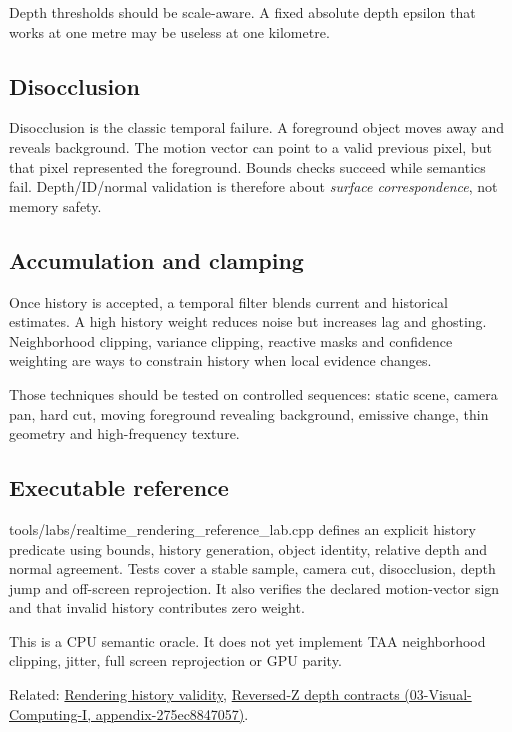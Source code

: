 Depth thresholds should be scale-aware. A fixed absolute depth epsilon that works at one metre may be useless at one kilometre.

\subsection{Disocclusion}\label{appendix-e8c352e39466-disocclusion}

Disocclusion is the classic temporal failure. A foreground object moves away and reveals background. The motion vector can point to a valid previous pixel, but that pixel represented the foreground. Bounds checks succeed while semantics fail. Depth/ID/normal validation is therefore about \emph{surface correspondence}, not memory safety.

\subsection{Accumulation and clamping}\label{appendix-e8c352e39466-accumulation-and-clamping}

Once history is accepted, a temporal filter blends current and historical estimates. A high history weight reduces noise but increases lag and ghosting. Neighborhood clipping, variance clipping, reactive masks and confidence weighting are ways to constrain history when local evidence changes.

Those techniques should be tested on controlled sequences: static scene, camera pan, hard cut, moving foreground revealing background, emissive change, thin geometry and high-frequency texture.

\subsection{Executable reference}\label{appendix-e8c352e39466-executable-reference}

tools/labs/realtime\_rendering\_reference\_lab.cpp defines an explicit history predicate using bounds, history generation, object identity, relative depth and normal agreement. Tests cover a stable sample, camera cut, disocclusion, depth jump and off-screen reprojection. It also verifies the declared motion-vector sign and that invalid history contributes zero weight.

This is a CPU semantic oracle. It does not yet implement TAA neighborhood clipping, jitter, full screen reprojection or GPU parity.

Related: \hyperref[appendix-2e7e9fd28a2c]{Rendering history validity}, \href{../03-Visual-Computing-I/main.pdf\#nameddest=appendix-275ec8847057}{Reversed-Z depth contracts (03-Visual-Computing-I, appendix-275ec8847057)}.
